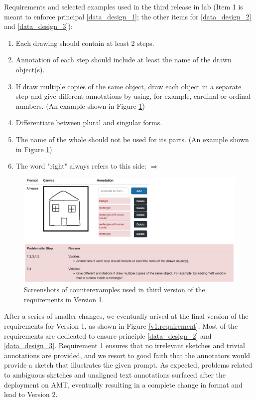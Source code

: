 Requirements and selected examples used in the third release in lab (Item 1 is meant to enforce principal \ref{data_design_1}; the other items for \ref{data_design_2} and \ref{data_design_3}):
\begin{enumerate}
\item Each drawing should contain at least 2 steps.
\item Annotation of each step should include at least the name of the drawn object(s).
\item If draw multiple copies of the same object, draw each object in a separate step and give different annotations by using, for example, cardinal or ordinal numbers. (An example shown in Figure \ref{v1.requirement_3})
\item Differentiate between plural and singular forms.
\item The name of the whole should not be used for its parts. (An example shown in Figure \ref{v1.requirement_3})
\item The word "right" always refers to this side: $\Longrightarrow$
\end{enumerate}

\begin{figure}[!htb]
\includegraphics[width=.8\linewidth]{data_collection/v1_requirement3_bad1.png}  
\caption{Screenshots of counterexamples used in third version of the requirements in Version 1.}
\label{v1.requirement_3}
\end{figure}

After a series of smaller changes, we eventually arived at the final version of the requirements for Version 1, as shown in Figure \ref{v1.requirement}. Most of the requirements are dedicated to ensure principle \ref{data_design_2} and \ref{data_design_3}. Requirement 1 ensures that no irrelevant sketches and trivial annotations are provided, and we resort to good faith that the annotators would provide a sketch that illustrates the given prompt. As expected, problems related to ambiguous sketches and unaligned text annotations surfaced after the deployment on AMT, eventually resulting in a complete change in format and lead to Version 2.     

